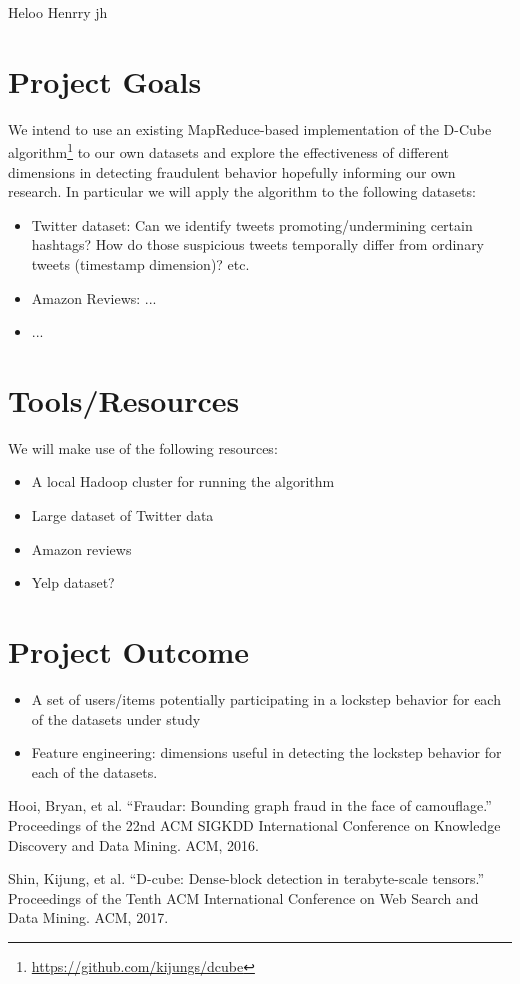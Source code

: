 \documentclass[12pt]{article}
\begin{document}
Heloo Henrry jh 
\section{Project Goals}

We intend to use an existing MapReduce-based implementation of the D-Cube algorithm\footnote{\href{https://github.com/kijungs/dcube}{https://github.com/kijungs/dcube}} to our own datasets and explore the effectiveness of different dimensions in detecting fraudulent behavior hopefully informing our own research. In particular we will apply the algorithm to the following datasets:
\begin{itemize}
\item Twitter dataset: Can we identify tweets promoting/undermining certain hashtags? How do those suspicious tweets temporally differ from ordinary tweets (timestamp dimension)? etc. 
\item Amazon Reviews: ...
\item ...
\end{itemize}
 
\section{Tools/Resources}
We will make use of the following resources:
\begin{itemize}
	\item A local Hadoop cluster for running the algorithm
	\item Large dataset of Twitter data
	\item Amazon reviews
	\item Yelp dataset?
\end{itemize}

\section{Project Outcome}

\begin{itemize}
	\item A set of users/items potentially participating in a lockstep behavior for each of the datasets under study
	\item Feature engineering: dimensions useful in detecting the lockstep behavior for each of the datasets.
\end{itemize}

  
\begin{thebibliography}{99}
 

 Hooi, Bryan, et al. ``Fraudar: Bounding graph fraud in the face of camouflage.'' Proceedings of the 22nd ACM SIGKDD International Conference on Knowledge Discovery and Data Mining. ACM, 2016.

 Shin, Kijung, et al. ``D-cube: Dense-block detection in terabyte-scale tensors.'' Proceedings of the Tenth ACM International Conference on Web Search and Data Mining. ACM, 2017.

\end{thebibliography}
\end{document}
